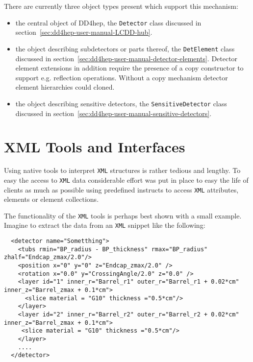 There are currently three object types present which support this mechanism:
\begin{itemize}
\item the central object of DD4hep, the \texttt{Detector} class discussed in section~\ref{sec:dd4hep-user-manual-LCDD-hub}.
\item the object describing subdetectors or parts thereof, the \texttt{DetElement} class discussed in section~\ref{sec:dd4hep-user-manual-detector-elements}. Detector element extensions in addition require the presence of a copy constructor to support e.g. reflection operations. Without a copy mechanism detector element hierarchies could cloned.
\item the object describing sensitive detectors, the \texttt{SensitiveDetector} class discussed in section~\ref{sec:dd4hep-user-manual-sensitive-detectors}.
\end{itemize}

\section{XML Tools and Interfaces}
\label{sec:dd4hep-user-manual-xml-tools}

Using native tools to interpret \texttt{XML} structures is rather tedious and lengthy. To easy the access to \texttt{XML} data considerable effort was put in place to easy the life of clients as much as possible using predefined instructs to access \texttt{XML} attributes, elements or element collections.

The functionality of the \texttt{XML} tools is perhaps best shown with a small example. Imagine to extract the data from an \texttt{XML} snippet like the following:
\begin{verbatim}
  <detector name="Sometthing">
    <tubs rmin="BP_radius - BP_thickness" rmax="BP_radius" zhalf="Endcap_zmax/2.0"/>
    <position x="0" y="0" z="Endcap_zmax/2.0" />
    <rotation x="0.0" y="CrossingAngle/2.0" z="0.0" />
    <layer id="1" inner_r="Barrel_r1" outer_r="Barrel_r1 + 0.02*cm" inner_z="Barrel_zmax + 0.1*cm">
      <slice material = "G10" thickness ="0.5*cm"/>
    </layer>
    <layer id="2" inner_r="Barrel_r2" outer_r="Barrel_r2 + 0.02*cm" inner_z="Barrel_zmax + 0.1*cm">
     <slice material = "G10" thickness ="0.5*cm"/>
    </layer>
    ....
  </detector>
\end{verbatim}

